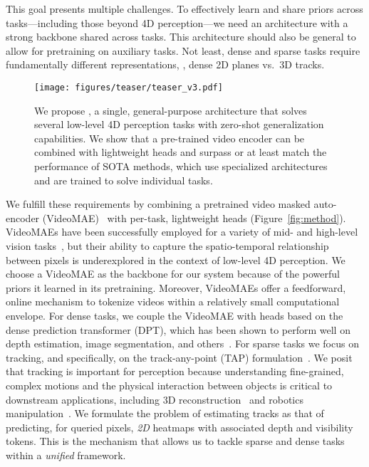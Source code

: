 This goal presents multiple challenges.
To effectively learn and share priors across tasks---including those beyond 4D perception---we need an architecture with a strong backbone shared across tasks.
This architecture should also be general to allow for pretraining on auxiliary tasks.
Not least, dense and sparse tasks require fundamentally different representations, \eg, dense 2D planes vs.~3D tracks.
\begin{figure}
    \captionsetup{skip=5pt}
    \centering
    \texttt{[image: figures/teaser/teaser\_v3.pdf]}
    \caption{We propose \methodName, a single, general-purpose architecture that solves several low-level 4D perception tasks with zero-shot generalization capabilities. We show that a pre-trained video encoder can be combined with lightweight heads and surpass or at least match the performance of SOTA methods, which use specialized architectures and are trained to solve individual tasks.}
    \label{fig:teaser}
\end{figure}
We fulfill these requirements by combining a pretrained video masked auto-encoder (VideoMAE)~\cite{tong2022videomae,wang2023videomaev2} with per-task, lightweight heads (Figure~\ref{fig:method}).
VideoMAEs have been successfully employed for a variety of mid- and high-level vision tasks~\cite{wang2023videomaev2}, but their ability to capture the spatio-temporal relationship between pixels is underexplored in the context of low-level 4D perception.
We choose a VideoMAE as the backbone for our system because of the powerful priors it learned in its pretraining.
Moreover, VideoMAEs offer a feedforward, online mechanism to tokenize videos within a relatively small computational envelope.
For dense tasks, we couple the VideoMAE with heads based on the dense prediction transformer (DPT), which has been shown to perform well on depth estimation, image segmentation, and others~\cite{ranftl2021dpt}.
For sparse tasks we focus on tracking, and specifically, on the track-any-point (TAP) formulation~\cite{doersch2022tap}.
We posit that tracking is important for perception because understanding fine-grained, complex motions and the physical interaction between objects is critical to downstream applications, including 3D reconstruction~\cite{lei2024mosca, wang2023vggsfm} and robotics manipulation~\cite{xu2024flow,wen2022you,wen2024anypointtrajectory, bharadhwaj2024track2act}.
We formulate the problem of estimating tracks as that of predicting, for queried pixels, \emph{2D} heatmaps with associated depth and visibility tokens.
This is the mechanism that allows us to tackle sparse and dense tasks within a \emph{unified} framework.

